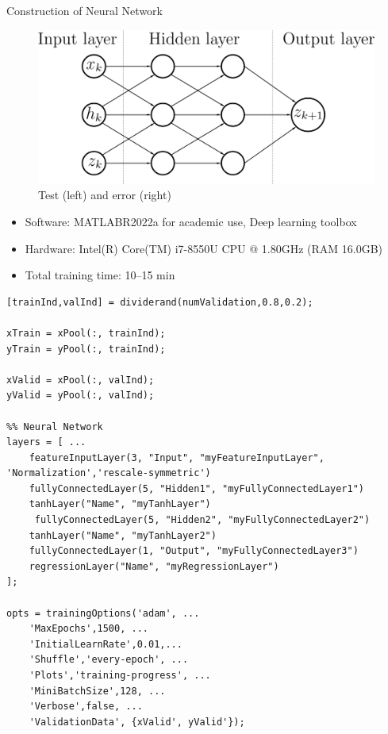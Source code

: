 \documentclass[9pt]{beamer}
\newcounter{frame}[frame]
\begin{document}
\begin{frame}{Construction of Neural Network}
\begin{figure}
	\includegraphics[height=.4\textheight]{NeuralNet}
	\caption{Test (left) and error (right)}
\end{figure}

\vspace{.5cm}
\begin{itemize}
	\item Software: MATLAB\texttrademark R2022a for academic use, Deep learning toolbox
	\item Hardware: Intel(R) Core(TM) i7-8550U CPU @ 1.80GHz (RAM 16.0GB)
	\item Total training time: 10--15 min
\end{itemize}
\end{frame}

\begin{frame}[fragile]
\scriptsize

	\begin{lstlisting}
[trainInd,valInd] = dividerand(numValidation,0.8,0.2);

xTrain = xPool(:, trainInd);
yTrain = yPool(:, trainInd);

xValid = xPool(:, valInd);
yValid = yPool(:, valInd);

%% Neural Network
layers = [ ...
    featureInputLayer(3, "Input", "myFeatureInputLayer", 'Normalization','rescale-symmetric')
    fullyConnectedLayer(5, "Hidden1", "myFullyConnectedLayer1")
    tanhLayer("Name", "myTanhLayer")
     fullyConnectedLayer(5, "Hidden2", "myFullyConnectedLayer2")
    tanhLayer("Name", "myTanhLayer2")   
    fullyConnectedLayer(1, "Output", "myFullyConnectedLayer3")
    regressionLayer("Name", "myRegressionLayer")
];

opts = trainingOptions('adam', ...
    'MaxEpochs',1500, ...
    'InitialLearnRate',0.01,...
    'Shuffle','every-epoch', ...
    'Plots','training-progress', ...
    'MiniBatchSize',128, ...
    'Verbose',false, ...
    'ValidationData', {xValid', yValid'});
	\end{lstlisting}
\end{frame}
%
\end{document}
